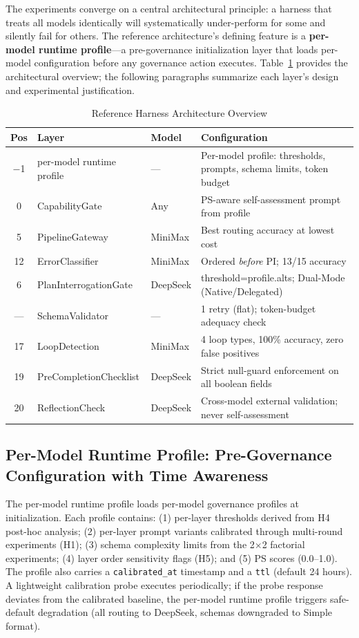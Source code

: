 \documentclass[11pt,a4paper]{article}
\begin{document}
The experiments converge on a central architectural principle: a harness that treats all models identically will systematically under-perform for some and silently fail for others. The reference architecture's defining feature is a \textbf{per-model runtime profile}---a pre-governance initialization layer that loads per-model configuration before any governance action executes. Table~\ref{tab:refarch} provides the architectural overview; the following paragraphs summarize each layer's design and experimental justification.

\begin{table}[htbp]\centering\caption{Reference Harness Architecture Overview}\label{tab:refarch}\small
\begin{tabular}{cllp{3.5cm}}\toprule\textbf{Pos} & \textbf{Layer} & \textbf{Model} & \textbf{Configuration}\\\midrule
$-$1 & per-model runtime profile & --- & Per-model profile: thresholds, prompts, schema limits, token budget\\\midrule
0 & CapabilityGate & Any & PS-aware self-assessment prompt from profile\\\midrule
5 & PipelineGateway & MiniMax & Best routing accuracy at lowest cost\\\midrule
12 & ErrorClassifier & MiniMax & Ordered \textit{before} PI; 13/15 accuracy\\\midrule
6 & PlanInterrogationGate & DeepSeek & threshold=profile.alts; Dual-Mode (Native/Delegated)\\\midrule
--- & SchemaValidator & --- & 1 retry (flat); token-budget adequacy check\\ \midrule
17 & LoopDetection & MiniMax & 4 loop types, 100\% accuracy, zero false positives\\\midrule
19 & PreCompletionChecklist & DeepSeek & Strict null-guard enforcement on all boolean fields\\\midrule
20 & ReflectionCheck & DeepSeek & Cross-model external validation; never self-assessment\\\bottomrule
\end{tabular}
\end{table}

\subsection{Per-Model Runtime Profile: Pre-Governance Configuration with Time Awareness}

The per-model runtime profile loads per-model governance profiles at initialization. Each profile contains: (1) per-layer thresholds derived from H4 post-hoc analysis; (2) per-layer prompt variants calibrated through multi-round experiments (H1); (3) schema complexity limits from the 2$\times$2 factorial experiments; (4) layer order sensitivity flags (H5); and (5) PS scores (0.0--1.0). The profile also carries a \texttt{calibrated\_at} timestamp and a \texttt{ttl} (default 24 hours). A lightweight calibration probe executes periodically; if the probe response deviates from the calibrated baseline, the per-model runtime profile triggers safe-default degradation (all routing to DeepSeek, schemas downgraded to Simple format).
\end{document}
